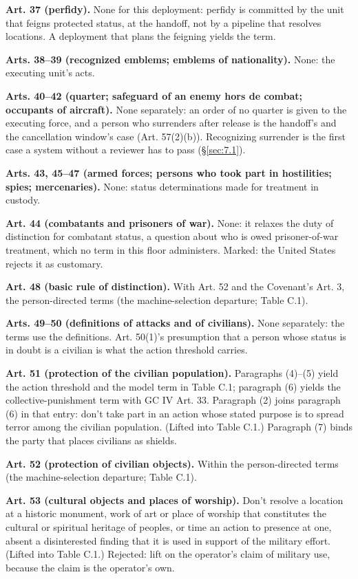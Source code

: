 \textbf{Art. 37 (perfidy).} None for this deployment: perfidy is committed by the unit that feigns protected status, at the handoff, not by a pipeline that resolves locations. A deployment that plans the feigning yields the term.

\textbf{Arts. 38–39 (recognized emblems; emblems of nationality).} None: the executing unit's acts.

\textbf{Arts. 40–42 (quarter; safeguard of an enemy hors de combat; occupants of aircraft).} None separately: an order of no quarter is given to the executing force, and a person who surrenders after release is the handoff's and the cancellation window's case (Art. 57(2)(b)). Recognizing surrender is the first case a system without a reviewer has to pass (\S\ref{sec:7.1}).

\textbf{Arts. 43, 45–47 (armed forces; persons who took part in hostilities; spies; mercenaries).} None: status determinations made for treatment in custody.

\textbf{Art. 44 (combatants and prisoners of war).} None: it relaxes the duty of distinction for combatant status, a question about who is owed prisoner-of-war treatment, which no term in this floor administers. Marked: the United States rejects it as customary.

\textbf{Art. 48 (basic rule of distinction).} With Art. 52 and the Covenant's Art. 3, the person-directed terms (the machine-selection departure; Table C.1).

\textbf{Arts. 49–50 (definitions of attacks and of civilians).} None separately: the terms use the definitions. Art. 50(1)'s presumption that a person whose status is in doubt is a civilian is what the action threshold carries.

\textbf{Art. 51 (protection of the civilian population).} Paragraphs (4)–(5) yield the action threshold and the model term in Table C.1; paragraph (6) yields the collective-punishment term with GC IV Art. 33. Paragraph (2) joins paragraph (6) in that entry: don't take part in an action whose stated purpose is to spread terror among the civilian population. (Lifted into Table C.1.) Paragraph (7) binds the party that places civilians as shields.

\textbf{Art. 52 (protection of civilian objects).} Within the person-directed terms (the machine-selection departure; Table C.1).

\textbf{Art. 53 (cultural objects and places of worship).} Don't resolve a location at a historic monument, work of art or place of worship that constitutes the cultural or spiritual heritage of peoples, or time an action to presence at one, absent a disinterested finding that it is used in support of the military effort. (Lifted into Table C.1.) Rejected: lift on the operator's claim of military use, because the claim is the operator's own.

